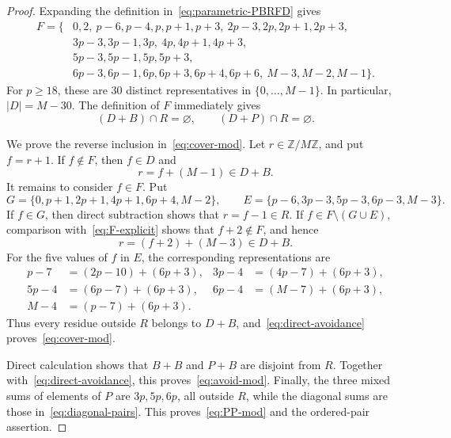 \documentclass[11pt,letterpaper]{article}
\newcommand{\ZM}{\mathbb{Z}/M\mathbb{Z}}
\begin{document}
\begin{proof}
Expanding the definition in~\eqref{eq:parametric-PBRFD} gives
\begin{equation}\label{eq:F-explicit}
\begin{split}
F=\{&0,2,\ p-6,p-4,p,p+1,p+3,\ 2p-3,2p,2p+1,2p+3,\\
&3p-3,3p-1,3p,\ 4p,4p+1,4p+3,\\
&5p-3,5p-1,5p,5p+3,\\
&6p-3,6p-1,6p,6p+3,6p+4,6p+6,\ M-3,M-2,M-1\}.
\end{split}
\end{equation}
For \(p\geq18\), these are \(30\) distinct representatives in \(\{0,\ldots,M-1\}\). In particular, \(|D|=M-30\). The definition of \(F\) immediately gives
\begin{equation}\label{eq:direct-avoidance}
(D+B)\cap R=\varnothing,
\qquad
(D+P)\cap R=\varnothing.
\end{equation}

We prove the reverse inclusion in~\eqref{eq:cover-mod}. Let \(r\in\ZM\), and put \(f=r+1\). If \(f\notin F\), then \(f\in D\) and
\[
r=f+(M-1)\in D+B.
\]
It remains to consider \(f\in F\). Put
\[
G=\{0,p+1,2p+1,4p+1,6p+4,M-2\},
\qquad
E=\{p-6,3p-3,5p-3,6p-3,M-3\}.
\]
If \(f\in G\), then direct subtraction shows that \(r=f-1\in R\). If \(f\in F\setminus(G\cup E)\), comparison with~\eqref{eq:F-explicit} shows that \(f+2\notin F\), and hence
\[
r=(f+2)+(M-3)\in D+B.
\]
For the five values of \(f\) in \(E\), the corresponding representations are
\begin{align*}
p-7&=(2p-10)+(6p+3),&
3p-4&=(4p-7)+(6p+3),\\
5p-4&=(6p-7)+(6p+3),&
6p-4&=(M-7)+(6p+3),\\
M-4&=(p-7)+(6p+3).
\end{align*}
Thus every residue outside \(R\) belongs to \(D+B\), and~\eqref{eq:direct-avoidance} proves~\eqref{eq:cover-mod}.

Direct calculation shows that \(B+B\) and \(P+B\) are disjoint from \(R\). Together with~\eqref{eq:direct-avoidance}, this proves~\eqref{eq:avoid-mod}. Finally, the three mixed sums of elements of \(P\) are \(3p,5p,6p\), all outside \(R\), while the diagonal sums are those in~\eqref{eq:diagonal-pairs}. This proves~\eqref{eq:PP-mod} and the ordered-pair assertion.
\end{proof}
\end{document}
